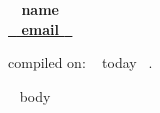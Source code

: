 \documentclass[11pt,english]{article}
\begin{document}

\begin{center}
\huge\bf\color{maincolor} ~{{ name }}~  \\
\small\color{black} \href{mailto: ~{{ email }}~ }{ ~{{ email }}~ } 
\end{center}
\href{https://twitter.com/kwcooper}{\faTwitter} 

\begin{flushright}
\vspace{3.5mm}
\tiny compiled on: ~{{ today }}~.
\end{flushright}

\vspace{-18mm}



~{{ body }}~
\end{document}
